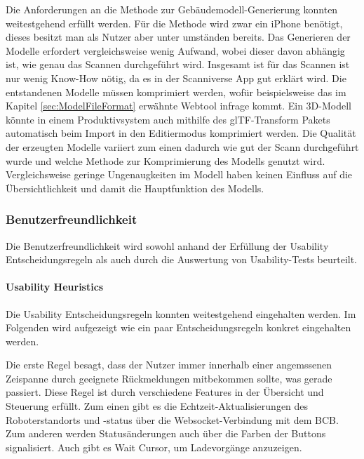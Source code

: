 Die Anforderungen an die Methode zur Gebäudemodell-Generierung konnten weitestgehend erfüllt werden. Für die Methode wird zwar ein iPhone benötigt, dieses besitzt man als Nutzer aber unter umständen bereits. Das Generieren der Modelle erfordert vergleichsweise wenig Aufwand, wobei dieser davon abhängig ist, wie genau das Scannen durchgeführt wird. Insgesamt ist für  das Scannen ist nur wenig Know-How nötig, da es in der Scanniverse App gut erklärt wird. Die entstandenen Modelle müssen komprimiert werden, wofür beispielsweise das im Kapitel \ref{sec:ModelFileFormat} erwähnte Webtool infrage kommt. Ein 3D-Modell könnte in einem Produktivsystem auch mithilfe des \ac{glTF}-Transform Pakets \cite{glTF-Transform} automatisch beim Import in den Editiermodus komprimiert werden. Die Qualität der erzeugten Modelle variiert zum einen dadurch wie gut der Scann durchgeführt wurde und welche Methode zur Komprimierung des Modells genutzt wird. Vergleichsweise geringe Ungenaugkeiten im Modell haben keinen Einfluss auf die Übersichtlichkeit und damit die Hauptfunktion des Modells. 

\subsubsection{Benutzerfreundlichkeit}
Die Benutzerfreundlichkeit wird sowohl anhand der Erfüllung der Usability Entscheidungsregeln als auch durch die Auswertung von Usability-Tests beurteilt.

\paragraph{Usability Heuristics}\label{sec:UsabilityHeuristics}
Die Usability Entscheidungsregeln konnten weitestgehend eingehalten werden. Im Folgenden wird aufgezeigt wie ein paar Entscheidungsregeln konkret eingehalten werden.

Die erste Regel besagt, dass der Nutzer immer innerhalb einer angemssenen Zeispanne durch geeignete Rückmeldungen mitbekommen sollte, was gerade passiert. Diese Regel ist durch verschiedene Features in der Übersicht und Steuerung erfüllt. Zum einen gibt es die Echtzeit-Aktualisierungen des Roboterstandorts und -status über die \gls{Websocket}-Verbindung mit dem \ac{BCB}. Zum anderen werden Statusänderungen auch über die Farben der Buttons signalisiert. Auch gibt es Wait Cursor, um Ladevorgänge anzuzeigen.


